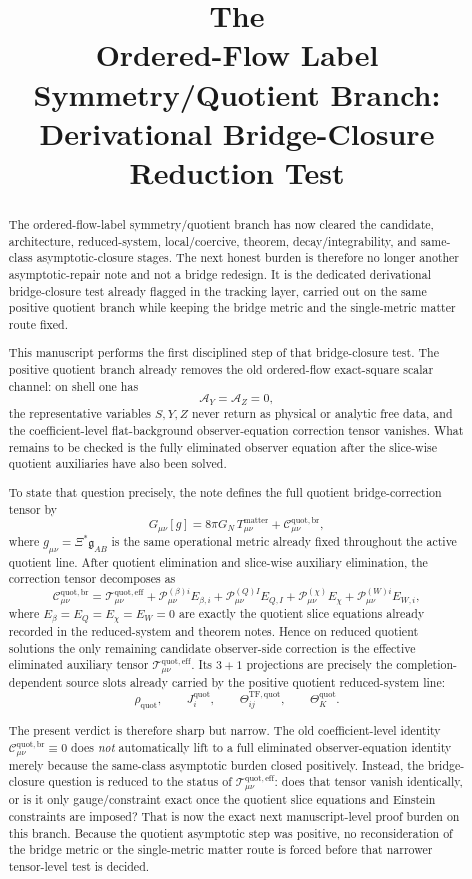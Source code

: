 \documentclass[11pt]{article}
\title{\textbf{The \TheoryName{}}\\[0.4em]
\large Ordered-Flow Label Symmetry/Quotient Branch: Derivational Bridge-Closure Reduction Test}
\author{}
\date{}
\newcommand{\BridgeMetric}{\mathfrak{g}}
\newcommand{\AY}{\mathcal A_Y}
\newcommand{\AZ}{\mathcal A_Z}
\newcommand{\EffAux}{\mathcal T_{\mu\nu}^{\mathrm{quot,eff}}}
\newcommand{\BridgeCorr}{\mathcal C_{\mu\nu}^{\mathrm{quot,br}}}
\begin{document}
\maketitle

\begin{abstract}
The ordered-flow-label symmetry/quotient branch has now cleared the candidate, architecture, reduced-system, local/coercive, theorem, decay/integrability, and same-class asymptotic-closure stages. The next honest burden is therefore no longer another asymptotic-repair note and not a bridge redesign. It is the dedicated derivational bridge-closure test already flagged in the tracking layer, carried out on the same positive quotient branch while keeping the bridge metric and the single-metric matter route fixed.

This manuscript performs the first disciplined step of that bridge-closure test. The positive quotient branch already removes the old ordered-flow exact-square scalar channel: on shell one has
\[
\AY=\AZ=0,
\]
the representative variables \(S,Y,Z\) never return as physical or analytic free data, and the coefficient-level flat-background observer-equation correction tensor vanishes. What remains to be checked is the fully eliminated observer equation after the slice-wise quotient auxiliaries have also been solved.

To state that question precisely, the note defines the full quotient bridge-correction tensor by
\[
G_{\mu\nu}[g]
=
8\pi G_N\,T_{\mu\nu}^{\mathrm{matter}}
+ \BridgeCorr,
\]
where \(g_{\mu\nu}=\Xi^*\BridgeMetric_{AB}\) is the same operational metric already fixed throughout the active quotient line. After quotient elimination and slice-wise auxiliary elimination, the correction tensor decomposes as
\[
\BridgeCorr
=
\EffAux
+ \mathcal P_{\mu\nu}^{(\beta)i}E_{\beta,i}
+ \mathcal P_{\mu\nu}^{(Q)I}E_{Q,I}
+ \mathcal P_{\mu\nu}^{(\chi)}E_\chi
+ \mathcal P_{\mu\nu}^{(W)i}E_{W,i},
\]
where \(E_{\beta}=E_Q=E_\chi=E_W=0\) are exactly the quotient slice equations already recorded in the reduced-system and theorem notes. Hence on reduced quotient solutions the only remaining candidate observer-side correction is the effective eliminated auxiliary tensor \(\EffAux\). Its \(3+1\) projections are precisely the completion-dependent source slots already carried by the positive quotient reduced-system line:
\[
\rho_{\mathrm{quot}},\qquad
J_i^{\mathrm{quot}},\qquad
\Theta_{ij}^{\mathrm{TF,quot}},\qquad
\Theta_K^{\mathrm{quot}}.
\]

The present verdict is therefore sharp but narrow. The old coefficient-level identity \(\BridgeCorr\equiv0\) does \emph{not} automatically lift to a full eliminated observer-equation identity merely because the same-class asymptotic burden closed positively. Instead, the bridge-closure question is reduced to the status of \(\EffAux\): does that tensor vanish identically, or is it only gauge/constraint exact once the quotient slice equations and Einstein constraints are imposed? That is now the exact next manuscript-level proof burden on this branch. Because the quotient asymptotic step was positive, no reconsideration of the bridge metric or the single-metric matter route is forced before that narrower tensor-level test is decided.
\end{abstract}
\end{document}
